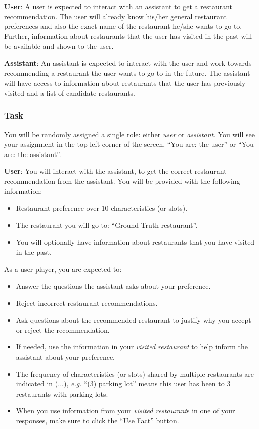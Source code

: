 \documentclass[11pt,a4paper]{article}
\makeatletter
\DeclareRobustCommand\onedot{\futurelet\@let@token\@onedot}
\def\onedot{. }
\def\eg{\emph{e.g}\onedot} \def\Eg{\emph{E.g}\onedot}
\makeatother
\begin{document}
\noindent \textbf{User}: A user is expected to interact with an assistant to get a restaurant recommendation.  The user will already know his/her general restaurant preferences and also the exact name of the restaurant he/she wants to go to. Further, information about restaurants that the user has visited in the past will be available and shown to the user.

\noindent \textbf{Assistant}: An assistant is expected to interact with the user and work towards recommending a restaurant the user wants to go to in the future. The assistant will have access to information about restaurants that the user has previously visited and a list of candidate restaurants.

\subsubsection{Task}
You will be randomly assigned a single role: either \textit{user} or \textit{assistant}. You will see your assignment in the top left corner of the screen, ``You are: the user'' or ``You are: the assistant''.

\noindent \textbf{User}: You will interact with the assistant, to get the correct restaurant recommendation from the assistant. You will be provided with the following information: 
\begin{itemize}
\itemsep0em
    \item Restaurant preference over 10 characteristics (or slots).
    \item The restaurant you will go to: ``Ground-Truth restaurant''.
    \item You will optionally have information about restaurants that you have visited in the past.
\end{itemize}

As a user player, you are expected to:
\begin{itemize}
\itemsep0em
    \item Answer the questions the assistant asks about your preference.
    \item Reject incorrect restaurant recommendations.
    \item Ask questions about the recommended restaurant to justify why you accept or reject the recommendation.
    \item If needed, use the information in your \textit{visited restaurant} to help inform the assistant about your preference.
    \item The frequency of characteristics (or slots) shared by multiple restaurants are indicated in (...), \eg ``(3) parking lot'' means this user has been to 3 restaurants with parking lots.
    \item When you use information from your \textit{visited restaurant}s in one of your responses, make sure to click the  ``Use Fact'' button.
\end{itemize}
\end{document}
